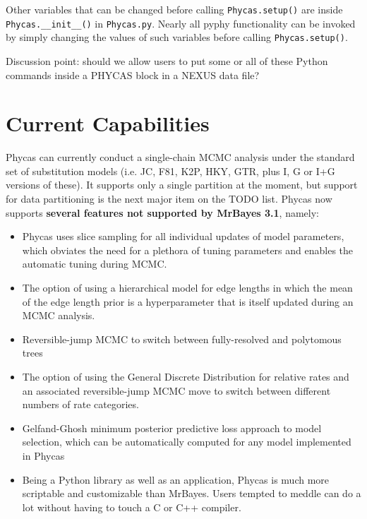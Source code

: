 \documentclass[10pt]{article}
\begin{document}
Other variables that can be changed before calling \verb+Phycas.setup()+ are inside \verb+Phycas.__init__()+ in {\tt Phycas.py}. Nearly all pyphy functionality can be invoked by simply changing the values of such variables before calling \verb+Phycas.setup()+.

Discussion point: should we allow users to put some or all of these Python commands inside a PHYCAS block in a NEXUS data file?

\section{Current Capabilities}

Phycas can currently conduct a single-chain MCMC analysis under the standard set of substitution models (i.e. JC, F81, K2P, HKY, GTR, plus I, G or I+G versions of these). It supports only a single partition at the moment, but support for data partitioning is the next major item on the TODO list. Phycas now supports {\bfseries several features not supported by MrBayes 3.1}, namely:

\begin{itemize}
\item Phycas uses slice sampling \citep{Neal2003a} for all individual updates of model parameters, which obviates the need for a plethora of tuning parameters and enables the automatic tuning during MCMC.
\item The option of using a hierarchical model for edge lengths in which the mean of the edge length prior is a hyperparameter that is itself updated during an MCMC analysis.
\item Reversible-jump MCMC to switch between fully-resolved and polytomous trees \citep{LewisHolderHolsinger2005}
\item The option of using the General Discrete Distribution for relative rates \citep{KosakovskypondMuse2005} and an associated reversible-jump MCMC move to switch between different numbers of rate categories.
\item Gelfand-Ghosh minimum posterior predictive loss approach to model selection, which can be automatically computed for any model implemented in Phycas
\item Being a Python library as well as an application, Phycas is much more scriptable and customizable than MrBayes. Users tempted to meddle can do a lot without having to touch a C or C++ compiler.
\end{itemize}
\end{document}
